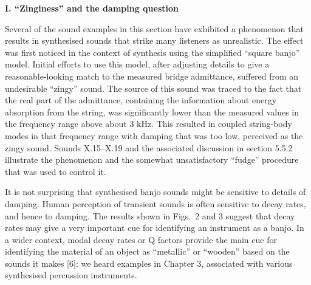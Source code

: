 




  \textbf{I. ``Zinginess'' and the damping question} 

  Several of the sound examples in this section have exhibited a phenomenon 
  that results in synthesised sounds that strike many listeners as unrealistic. 
  The effect was first noticed in the context of synthesis using the simplified 
  ``square banjo'' model. Initial efforts to use this model, after adjusting 
  details to give a reasonable-looking match to the measured bridge admittance, 
  suffered from an undesirable ``zingy'' sound. The source of this sound was 
  traced to the fact that the real part of the admittance, containing the 
  information about energy absorption from the string, was significantly lower 
  than the measured values in the frequency range above about 3 kHz. This 
  resulted in coupled string-body modes in that frequency range with damping 
  that was too low, perceived as the zingy sound. Sounds X.15--X.19 and the 
  associated discussion in section 5.5.2 illustrate the phenomenon and the 
  somewhat unsatisfactory ``fudge'' procedure that was used to control it. 

  It is not surprising that synthesised banjo sounds might be sensitive to 
  details of damping. Human perception of transient sounds is often sensitive 
  to decay rates, and hence to damping. The results shown in Figs.\ 2 and 3 
  suggest that decay rates may give a very important cue for identifying an 
  instrument as a banjo. In a wider context, modal decay rates or Q factors 
  provide the main cue for identifying the material of an object as 
  ``metallic'' or ``wooden'' based on the sounds it makes [6]: we heard 
  examples in Chapter 3, associated with various synthesised percussion 
  instruments. 

